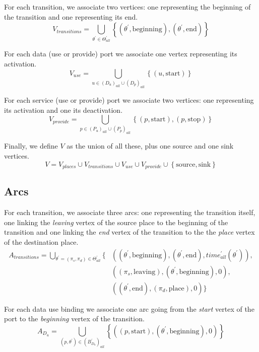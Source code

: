 For each transition, we associate two vertices: one representing the
beginning of the transition and one representing its end. 
\[
V_{transitions}=\bigcup_{\theta^{\prime}\in\Theta_{all}^{\prime}}\left\{ \left(\theta^{\prime},\text{beginning}\right),\left(\theta^{\prime},\text{end}\right)\right\} 
\]

For each data (use or provide) port we associate one vertex representing
its activation. 
\[
V_{use}=\bigcup_{u\in\left(D_{u}\right)_{all}\cup\left(D_{p}\right)_{all}}\left\{ \left(u,\text{start}\right)\right\} 
\]

For each service (use or provide) port we associate two vertices:
one representing its activation and one its deactivation. 
\[
V_{provide}=\bigcup_{p\in\left(P_{u}\right)_{all}\cup\left(P_{p}\right)_{all}}\left\{ \left(p,\text{start}\right),\left(p,\text{stop}\right)\right\} 
\]

Finally, we define $V$ as the union of all these, plus one source
and one sink vertices. 
\[
V=V_{places}\cup V_{transitions}\cup V_{use}\cup V_{provide}\cup\left\{ \text{source},\text{sink}\right\} 
\]


\subsection{Arcs}

For each transition, we associate three arcs: one representing the
transition itself, one linking the \emph{leaving} vertex of the source
place to the beginning of the transition and one linking the \emph{end}
vertex of the transition to the the \emph{place} vertex of the destination
place. 
\begin{align*}
A_{transitions}=\bigcup_{\theta^{\prime}=\left(\pi_{s},\pi_{d}\right)\in\Theta_{all}^{\prime}}\{ & \left(\left(\theta^{\prime},\text{beginning}\right),\left(\theta^{\prime},\text{end}\right),time_{all}^{\prime}\left(\theta^{\prime}\right)\right),\\
 & \left(\left(\pi_{s},\text{leaving}\right),\left(\theta^{\prime},\text{beginning}\right),0\right),\\
 & \left(\left(\theta^{\prime},\text{end}\right),\left(\pi_{d},\text{place}\right),0\right)\}
\end{align*}

For each data use binding we associate one arc going from the \emph{start}
vertex of the port to the \emph{beginning} vertex of the transition.
\[
A_{D_{u}}=\bigcup_{\left(p,\theta^{\prime}\right)\in\left(B_{D_{u}}^{\prime}\right)_{all}}\left\{ \left(\left(p,\text{start}\right),\left(\theta^{\prime},\text{beginning}\right),0\right)\right\} 
\]

